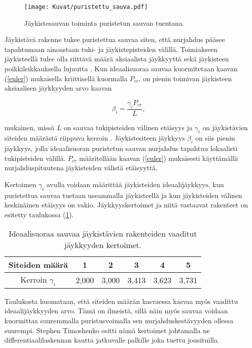 \documentclass[12pt]{article}
\newenvironment{content}{\pagenumbering{arabic}}{}
\begin{document}
\begin{content}
\begin{figure}[htb]
\centering
\texttt{[image: Kuvat/puristettu\_sauva.pdf]}
\caption{Jäykistesauvan toiminta puristetun sauvan tuentana.}
\label{fig:puristettu_sauva}
\end{figure}

Jäykistävä rakenne tukee puristettua sauvaa siten, että nurjahdus pääsee tapahtumaan ainoastaan tuki- ja jäykistepisteiden välillä. Toimiakseen jäykisteellä tulee olla riittävä määrä aksiaalista jäykkyyttä sekä jäykisteen poikkileikkauksella lujuutta \parencite{winter}. Kun ideaalisuoraa sauvaa kuormitetaan kaavan (\ref{euler}) mukaisella kriittisellä kuormalla $P_{cr}$, on pienin toimivan jäykisteen aksiaalisen jäykkyyden arvo kaavan

\begin{equation}
\label{ideaalijäykkyys}
\beta_i = \frac{\gamma_i P_{cr}}{L},
\end{equation}

mukainen, missä $L$ on sauvaa tukipisteiden välinen etäisyys ja $\gamma_i$ on jäykistävien siteiden määrästä riippuva kerroin \parencite[76]{timoshenko}. Jäykistesiteen jäykkyys $\beta_i$ on siis pienin jäykkyys, jolla ideaalisuoran puristetun sauvan nurjahdus tapahtuu lokaalisti tukipisteiden välillä. $P_{cr}$ määritellään kaavan (\ref{euler}) mukaisesti käyttämällä nurjahduspituutena jäykisteiden välistä etäisyyttä. 

Kertoimen $\gamma_i$ avulla voidaan määrittää jäykisteiden ideaalijäykkyys, kun puristettua sauvaa tuetaan useammalla jäykisteellä ja kun jäykisteiden välinen keskinäinen etäisyys on vakio. Jäykkyyskertoimet ja niitä vastaavat rakenteet on esitetty taulukossa (\ref{tab:ideaalijäykkyydet}).

\begin{table}[htb]
\centering
\caption{Ideaalisuoraa sauvaa jäykistävien rakenteiden vaaditut jäykkyyden kertoimet.}
\begin{tabular}{c c c c c c}
\label{tab:ideaalijäykkyydet}

Siteiden määrä & 1 & 2 & 3 & 4 & 5   \\
\hline
Kerroin $\gamma_i$ & 2,000 &3,000 & 3,413 & 3,623 & 3,731 
\end{tabular}
\end{table}

Taulukosta huomataan, että siteiden määrän kasvaessa kasvaa myös vaadittu ideaalijäykkyyden arvo. Tämä on ilmeistä, sillä näin myös sauvaa voidaan kuormittaa suuremmalla puristusvoimalla sen nurjahduskestävyyden ollessa suurempi. Stephen Timoshenko esitti nämä kertoimet \parencite{timoshenko} johtamalla ne differentiaalilaskennan kautta jatkuvalle palkille joka tuettu jousituilla. 


\end{content}
\end{document}
